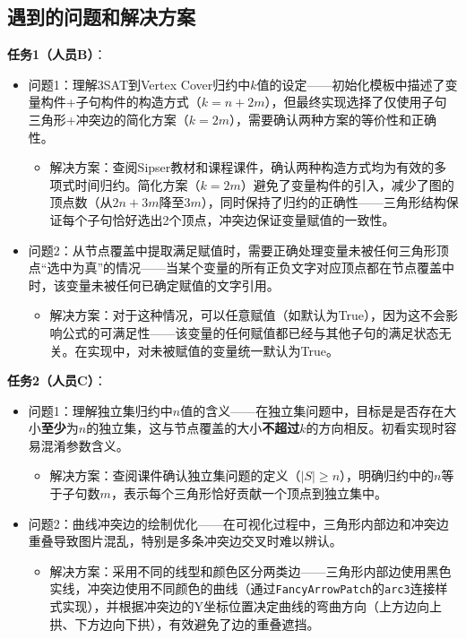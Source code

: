 \documentclass{sysucseexp}
\begin{document}
\subsection{遇到的问题和解决方案}

\textbf{任务1（人员B）}：
\begin{itemize}
    \item 问题1：理解3SAT到Vertex Cover归约中$k$值的设定——初始化模板中描述了变量构件+子句构件的构造方式（$k = n + 2m$），但最终实现选择了仅使用子句三角形+冲突边的简化方案（$k = 2m$），需要确认两种方案的等价性和正确性。
    \begin{itemize}
        \item 解决方案：查阅Sipser教材和课程课件，确认两种构造方式均为有效的多项式时间归约。简化方案（$k = 2m$）避免了变量构件的引入，减少了图的顶点数（从$2n + 3m$降至$3m$），同时保持了归约的正确性——三角形结构保证每个子句恰好选出2个顶点，冲突边保证变量赋值的一致性。
    \end{itemize}
    \item 问题2：从节点覆盖中提取满足赋值时，需要正确处理变量未被任何三角形顶点``选中为真''的情况——当某个变量的所有正负文字对应顶点都在节点覆盖中时，该变量未被任何已确定赋值的文字引用。
    \begin{itemize}
        \item 解决方案：对于这种情况，可以任意赋值（如默认为True），因为这不会影响公式的可满足性——该变量的任何赋值都已经与其他子句的满足状态无关。在实现中，对未被赋值的变量统一默认为True。
    \end{itemize}
\end{itemize}

\textbf{任务2（人员C）}：
\begin{itemize}
    \item 问题1：理解独立集归约中$n$值的含义——在独立集问题中，目标是是否存在大小\textbf{至少}为$n$的独立集，这与节点覆盖的大小\textbf{不超过}$k$的方向相反。初看实现时容易混淆参数含义。
    \begin{itemize}
        \item 解决方案：查阅课件确认独立集问题的定义（$|S| \geq n$），明确归约中的$n$等于子句数$m$，表示每个三角形恰好贡献一个顶点到独立集中。
    \end{itemize}
    \item 问题2：曲线冲突边的绘制优化——在可视化过程中，三角形内部边和冲突边重叠导致图片混乱，特别是多条冲突边交叉时难以辨认。
    \begin{itemize}
        \item 解决方案：采用不同的线型和颜色区分两类边——三角形内部边使用黑色实线，冲突边使用不同颜色的曲线（通过\texttt{FancyArrowPatch}的\texttt{arc3}连接样式实现），并根据冲突边的Y坐标位置决定曲线的弯曲方向（上方边向上拱、下方边向下拱），有效避免了边的重叠遮挡。
    \end{itemize}
\end{itemize}
\end{document}
